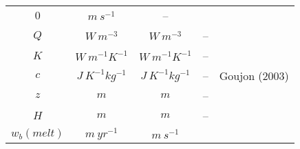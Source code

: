 \documentclass[a4paper,11pt]{article}
\begin{document}
\begin{longtable}{|c|c|c|c|c|}
\begin{math} 0\end{math} &
\begin{math} m \: s^{-1}\end{math} &
-- & \\
\cline{1-4}
\begin{math}Q\end{math} &
\begin{math} W \: m^{-3}\end{math} &
\begin{math} W \: m^{-3}\end{math} &
-- & \\
\cline{1-4}
\begin{math}K\end{math} &
\begin{math} W \: m^{-1} K^{-1} \end{math} &
\begin{math} W \: m^{-1} K^{-1}\end{math} &
-- & \\
\cline{1-4}
\begin{math}c\end{math} &
\begin{math} J \: K^{-1} kg^{-1}\end{math} &
\begin{math} J \: K^{-1} kg^{-1}\end{math} &
-- &
Goujon (2003) \cite{goujon_2003}\\
\cline{1-4}
\begin{math}z\end{math} &
\begin{math} m \end{math} &
\begin{math} m\end{math} &
-- & \\
\cline{1-4}
\begin{math}H\end{math} &
\begin{math} m \end{math} &
\begin{math} m\end{math} &
-- & \\
\cline{1-4}
\begin{math}w_b(melt)\end{math} &
\begin{math} m \: yr^{-1} \end{math} &
\begin{math} m \: s^{-1}\end{math} &

\end{longtable}
\end{document}
